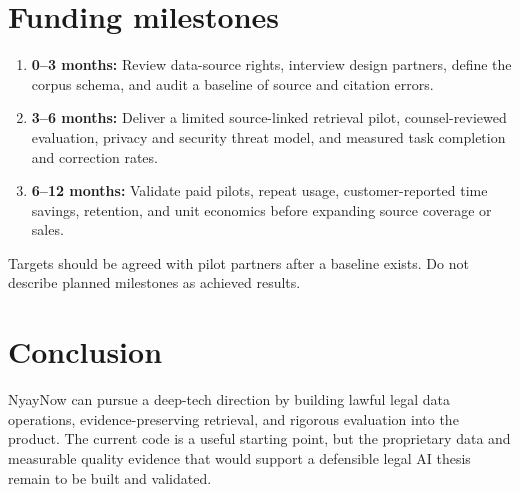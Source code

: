\documentclass[11pt]{article}
\begin{document}
\section{Funding milestones}
\begin{enumerate}[leftmargin=*]
  \item \textbf{0--3 months:} Review data-source rights, interview design partners, define the corpus schema, and audit a baseline of source and citation errors.
  \item \textbf{3--6 months:} Deliver a limited source-linked retrieval pilot, counsel-reviewed evaluation, privacy and security threat model, and measured task completion and correction rates.
  \item \textbf{6--12 months:} Validate paid pilots, repeat usage, customer-reported time savings, retention, and unit economics before expanding source coverage or sales.
\end{enumerate}
Targets should be agreed with pilot partners after a baseline exists. Do not describe planned milestones as achieved results.

\section{Conclusion}
NyayNow can pursue a deep-tech direction by building lawful legal data operations, evidence-preserving retrieval, and rigorous evaluation into the product. The current code is a useful starting point, but the proprietary data and measurable quality evidence that would support a defensible legal AI thesis remain to be built and validated.
\end{document}
